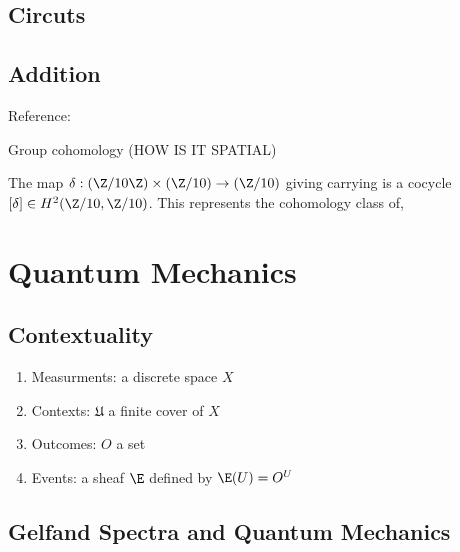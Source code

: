 \documentclass[12pt]{article}
\begin{document}
\subsection{Circuts}

\subsection{Addition}

Reference: 

Group cohomology (HOW IS IT SPATIAL)


The map $\delta : (\Z / 10 \Z) \times (\Z / 10) \to (\Z / 10)$ giving carrying is a cocycle $[\delta] \in H^2(\Z/10, \Z/10)$. This represents the cohomology class of,
\begin{center}
\end{center}

\section{Quantum Mechanics}

\newcommand{\fU}{\mathfrak{U}}

\subsection{Contextuality}

\begin{enumerate}
\item Measurments: a discrete space $X$

\item Contexts: $\fU$ a finite cover of $X$
\item Outcomes: $O$ a set

\item Events: a sheaf $\E$ defined by $\E(U) = O^U$
\end{enumerate}

\begin{example}

\end{example}

\subsection{Gelfand Spectra and Quantum Mechanics}
\end{document}
